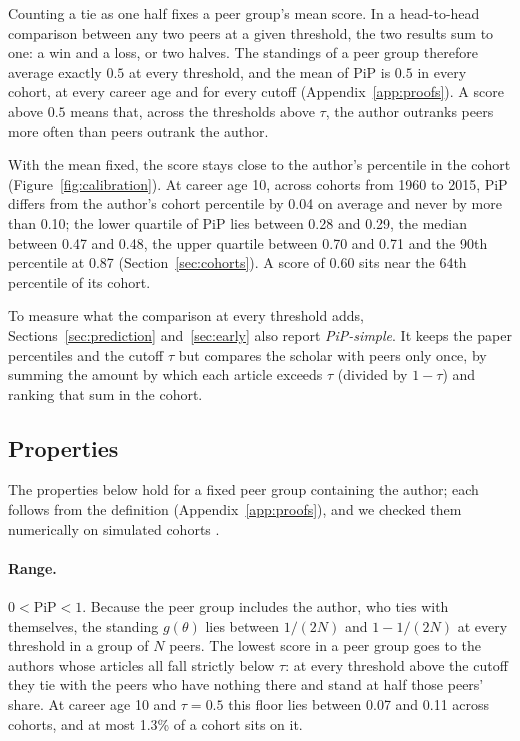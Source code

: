 \documentclass[11pt]{article}
\newcommand{\PiP}{\mathrm{PiP}}
\begin{document}
Counting a tie as one half fixes a peer group's mean score. In a head-to-head comparison between any two peers at a
given threshold, the two results sum to one: a win and a loss, or two halves. The standings of a peer group therefore
average exactly $0.5$ at every threshold, and the mean of PiP is $0.5$ in every cohort, at every career age and for
every cutoff (Appendix~\ref{app:proofs}). A score above $0.5$ means that, across the thresholds above $\tau$, the author
outranks peers more often than peers outrank the author.

With the mean fixed, the score stays close to the author's percentile in the cohort
(Figure~\ref{fig:calibration}). At career age 10, across cohorts
from 1960 to 2015, PiP differs from the author's cohort percentile by 0.04 on average and never by more than 0.10; the
lower quartile of PiP lies between 0.28 and 0.29, the median between 0.47 and 0.48, the upper quartile between 0.70 and
0.71 and the 90th percentile at 0.87 (Section~\ref{sec:cohorts}). A score of 0.60 sits near the 64th percentile of its
cohort.

To measure what the comparison at every threshold adds, Sections~\ref{sec:prediction} and~\ref{sec:early} also report
\emph{PiP-simple}. It keeps the paper percentiles and the cutoff $\tau$ but compares the scholar with peers only once, by
summing the amount by which each article exceeds $\tau$ (divided by $1-\tau$) and ranking that sum in the cohort.

\subsection{Properties}
\label{sec:properties}
The properties below hold for a fixed peer group containing the author; each follows from the definition
(Appendix~\ref{app:proofs}), and we checked them numerically on simulated cohorts \citep{ipeirotis2026replication}.

\paragraph{Range.} $0 < \PiP < 1$. Because the peer group includes the author, who ties with themselves, the standing
$g(\theta)$ lies between $1/(2N)$ and $1 - 1/(2N)$ at every threshold in a group of $N$ peers. The lowest score in a
peer group goes to the authors whose articles all fall strictly below $\tau$: at every threshold above the cutoff they
tie with the peers who have nothing there and stand at half those peers' share. At career age 10 and $\tau = 0.5$ this
floor lies between 0.07 and 0.11 across cohorts, and at most 1.3\% of a cohort sits on it.
\end{document}
